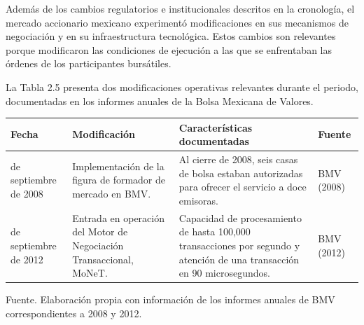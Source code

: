 Además de los cambios regulatorios e institucionales descritos en la cronología, el mercado accionario mexicano experimentó modificaciones en sus mecanismos de negociación y en su infraestructura tecnológica. Estos cambios son relevantes porque modificaron las condiciones de ejecución a las que se enfrentaban las órdenes de los participantes bursátiles.

La Tabla 2.5 presenta dos modificaciones operativas relevantes durante el periodo, documentadas en los informes anuales de la Bolsa Mexicana de Valores.


{\small
\begin{longtable}[]{@{}
  >{\raggedright\arraybackslash}p{}
  >{\raggedright\arraybackslash}p{}
  >{\raggedright\arraybackslash}p{}
  >{\raggedright\arraybackslash}p{}@{}}
\toprule\noalign{}
\begin{minipage}[b]{\linewidth}\raggedright
\textbf{Fecha}
\end{minipage} & \begin{minipage}[b]{\linewidth}\raggedright
\textbf{Modificación}
\end{minipage} & \begin{minipage}[b]{\linewidth}\raggedright
\textbf{Características documentadas}
\end{minipage} & \begin{minipage}[b]{\linewidth}\raggedright
\textbf{Fuente}
\end{minipage} \\
\midrule\noalign{}
\endhead
\bottomrule\noalign{}
\endlastfoot
18 de septiembre de 2008 & Implementación de la figura de formador de mercado en BMV. & Al cierre de 2008, seis casas de bolsa estaban autorizadas para ofrecer el servicio a doce emisoras. & BMV (2008) \\
3 de septiembre de 2012 & Entrada en operación del Motor de Negociación Transaccional, MoNeT. & Capacidad de procesamiento de hasta 100,000 transacciones por segundo y atención de una transacción en 90 microsegundos. & BMV (2012) \\
\end{longtable}
}

Fuente. Elaboración propia con información de los informes anuales de BMV correspondientes a 2008 y 2012.

